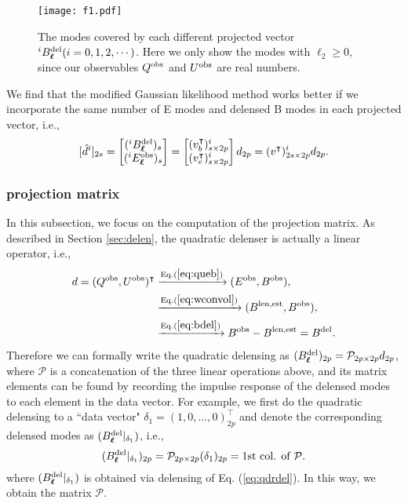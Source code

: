 \documentclass[aps, prd, reprint, nofootinbib, groupedaddress, showpacs]{revtex4-1}
\def\be{\begin{equation}}
\def\ee{\end{equation}}
\newcommand*\Bell{\ensuremath{\boldsymbol\ell}}
\begin{document}
\begin{figure}
\centering
\texttt{[image: f1.pdf]}
\caption{ \label{fig:Bdel}
The modes covered by each different projected vector $^i B_{\Bell}^{\rm del} (i = 0, 1, 2, \cdots)$.
Here we only show the modes with $\ell_2 \geq 0$, since our observables $Q^{\rm obs}$
and $U^{\rm obs}$ are real numbers.}
\end{figure}

We find that the modified Gaussian likelihood
method works better if we incorporate the same number of E modes
and delensed B modes in each projected vector,
i.e.,
\be
\label{eq:ebproj}
[\hat d^i]_{2s} =
\begin{bmatrix}
    (^iB^{\rm del}_{\Bell})_s\\
    (^iE^{\rm obs}_{\Bell})_s
\end{bmatrix}
= \begin{bmatrix}
    (v_b^\intercal)^i_{s\times 2p}\\
    (v_e^\intercal)^i_{s\times 2p}
\end{bmatrix}  d_{2p} = (v^\intercal)^i_{2s\times 2p} d_{2p}.
\ee

\subsubsection{projection matrix}
In this subsection, we focus on the computation of the projection matrix.
As described in Section \ref{sec:delen}, the quadratic delenser is actually a linear operator,
i.e.,
\be
\label{eq:qdrdel}
\begin{aligned}
d=(Q^{\rm obs}, U^{\rm obs})^\intercal &\xrightarrow{{\rm Eq.}(\ref{eq:queb})}  (E^{\rm obs}, B^{\rm obs}) ,  \\
 & \xrightarrow{{\rm Eq.}(\ref{eq:wconvol})} (B^{\rm len, est}, B^{\rm obs}) , \\
 & \xrightarrow {{\rm Eq.}(\ref{eq:bdel}) } B^{\rm obs}- B^{\rm len, est} = B^{\rm del}.
\end{aligned}
\ee
Therefore we can formally write the quadratic delensing as
$(B^{\rm del}_{\Bell})_{2p} = \mathcal P_{2p\times 2p} d_{2p}$,
where $\mathcal P$ is a concatenation of the three linear operations above,
and its matrix elements can be found by
recording the impulse response of the delensed modes
to each element in the data vector.
For example, we first do the quadratic delensing to a ``data vector"
$\delta_1 = (1,0, \dots,0)^\intercal_{2p}$
and denote the corresponding delensed modes as $(B^{\rm del}_{\Bell}|_{\delta_1})$,
i.e.,
\be
(B^{\rm del}_{\Bell}|_{\delta_1})_{2p} = \mathcal P_{2p\times2p} (\delta_1)_{2p} = \textrm{1st col. of}\ \mathcal P.
\ee
where $(B^{\rm del}_{\Bell}|_{\delta_1})$ is obtained via delensing of Eq. (\ref{eq:qdrdel}).
In this way, we obtain the matrix $\mathcal P$.
\end{document}
